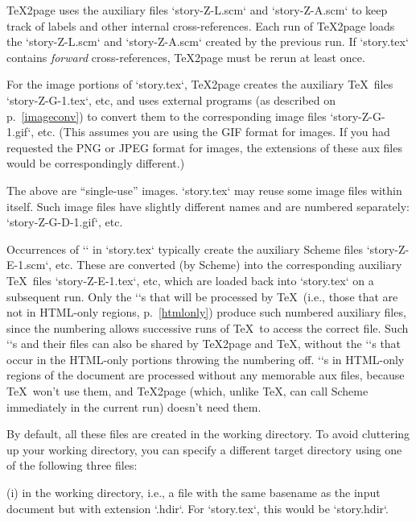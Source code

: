 \TeX2page uses the auxiliary files `story-Z-L.scm` and
`story-Z-A.scm` to keep track of labels and other
internal cross-references.  Each run of \TeX2page loads
the `story-Z-L.scm` and `story-Z-A.scm`
created by the previous run.  If `story.tex` contains
{\em forward} cross-references, \TeX2page must be rerun
at least once.

For the image portions of `story.tex`, \TeX2page creates the auxiliary \TeX\
files `story-Z-G-1.tex`, etc, and uses external programs (as described on
p.~\ref{imageconv}) to convert them to the corresponding image files
`story-Z-G-1.gif`, etc.  (This assumes you are using the GIF format for
images.  If you had requested the PNG or JPEG format for images, the
extensions of these aux files would be correspondingly different.)

The above are “single-use” images.
`story.tex` may reuse some image files within itself.
Such image files have slightly different names and are
numbered separately: `story-Z-G-D-1.gif`, etc.


Occurrences of `\eval` in `story.tex` typically
create the auxiliary Scheme files `story-Z-E-1.scm`,
etc.  These are converted (by Scheme) into the
corresponding auxiliary \TeX\ files `story-Z-E-1.tex`,
etc, which are loaded back into `story.tex` on a
subsequent run.  Only the `\eval`s that will be
processed by \TeX\ (i.e., those that are not in
HTML-only regions, p.~\ref{htmlonly})
produce such numbered auxiliary files,
since the numbering allows successive runs of \TeX\ to
access the correct file.  Such `\eval`s and their
files can also be shared by \TeX2page and \TeX, without
the `\eval`s that occur in the HTML-only portions
throwing the numbering off.  `\eval`s in
HTML-only
regions of the document are processed
without any memorable aux files, because \TeX\ won’t use
them, and \TeX2page (which, unlike \TeX, can call Scheme
immediately in the
current run) doesn’t need them.


By default, all these files are created in the working
directory.  To avoid cluttering up
your working directory, you can specify a different target directory
using one of the following three files:

\item(i)  in the working directory, i.e.,
a file with the same basename as the input document but with
extension `.hdir`.  For `story.tex`, this would
be `story.hdir`.

